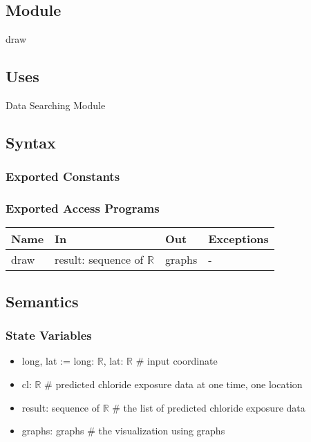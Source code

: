 \documentclass[12pt, titlepage]{article}
\begin{document}


\subsection{Module}

draw

\subsection{Uses}

Data Searching Module

\subsection{Syntax}

\subsubsection{Exported Constants}

\subsubsection{Exported Access Programs}

\begin{center}
\begin{tabular}{p{2cm} p{4cm} p{7cm} p{2cm}}
\hline
\textbf{Name} & \textbf{In} & \textbf{Out} & \textbf{Exceptions} \\
\hline
draw & result: sequence of $\mathbb{R}$ & graphs & - \\
\hline
\end{tabular}
\end{center}

\subsection{Semantics}

\subsubsection{State Variables}
\begin{itemize}
\item long, lat := long: $\mathbb{R}$, lat: $\mathbb{R}$ \# input coordinate
\item cl: $\mathbb{R}$ \# predicted chloride exposure data at one time, one location
\item result: sequence of $\mathbb{R}$ \# the list of predicted chloride exposure data
\item graphs: graphs \# the visualization using graphs

\end{itemize}
\end{document}
